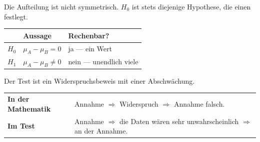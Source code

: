 \begin{merksatz}
Die Aufteilung ist nicht symmetrisch. $H_0$ ist stets diejenige Hypothese, die einen  festlegt.

\begin{center}
\renewcommand{\arraystretch}{1.55}
\begin{tabular}{@{}P{2.0cm}P{2.4cm}P{4.0cm}@{}}
\toprule
& \textbf{Aussage} & \textbf{Rechenbar?}\\
\midrule
$H_0$ & $\mu_A - \mu_B = 0$ & \textcolor{gruen}{ja --- ein Wert}\\
$H_1$ & $\mu_A - \mu_B \neq 0$ & \textcolor{akzent}{nein --- unendlich viele}\\
\bottomrule
\end{tabular}
\end{center}

\begin{center}
\begin{minipage}{0.88\textwidth}
\end{minipage}
\end{center}
\end{merksatz}

\begin{merksatz}
Der Test ist ein Widerspruchsbeweis mit einer Abschwächung.

\begin{center}
\renewcommand{\arraystretch}{1.55}
\begin{tabular}{@{}P{2.4cm}P{6.2cm}@{}}
\toprule
\textbf{In der Mathematik} & Annahme $\Rightarrow$ Widerspruch $\Rightarrow$ Annahme falsch.\\
\textbf{Im Test} & Annahme $\Rightarrow$ die Daten wären sehr unwahrscheinlich $\Rightarrow$  an der Annahme.\\
\bottomrule
\end{tabular}
\end{center}

\begin{center}
\begin{minipage}{0.88\textwidth}
\end{minipage}
\end{center}
\end{merksatz}

